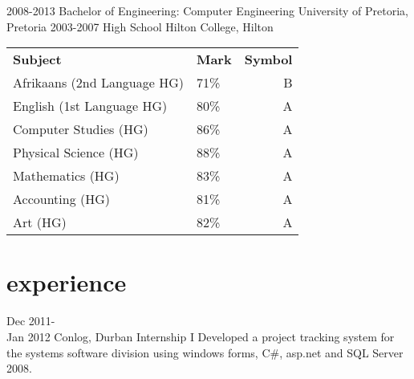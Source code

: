 \documentclass[a4paper]{friggeri-cv}
\begin{document}
\begin{entrylist}
  \entry
    {2008-2013}
    { Bachelor of Engineering: Computer Engineering}
    {University of Pretoria, Pretoria}
    {}
  \entry
    {2003-2007}
    { High School}
    {Hilton College, Hilton}
    { \begin{tabular}{p{5cm} p{1.5cm} r}
    		\textbf{Subject} & \textbf{Mark} & \textbf{Symbol}\\   		Afrikaans (2nd Language HG) & 71\% & B\\
    		English (1st Language HG) & 80\% & A\\
    		Computer Studies (HG) & 86\% & A\\
    		Physical Science (HG) & 88\% & A\\
    		Mathematics (HG) & 83\% & A\\
    		Accounting (HG) & 81\% & A\\
    		Art (HG) & 82\% & A\\
	\end{tabular}}
\end{entrylist}

\section{experience}

\begin{entrylist}
  \entry
    {Dec 2011-\\ Jan 2012}
    {Conlog, Durban}
    {Internship}
    {I Developed a project tracking system for the systems software division using windows forms, C#, asp.net and SQL Server 2008.}
\end{entrylist}
\end{document}
